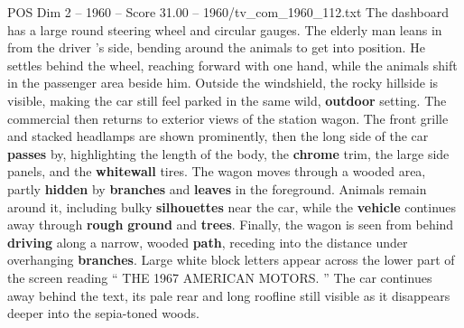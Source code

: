 \begin{textsample}{POS Dim 2 – 1960 – Score 31.00 – 1960/tv\_com\_1960\_112.txt}
The dashboard has a large round steering wheel and circular gauges.
The elderly man leans in from the driver ’s side, bending around the animals to get into position.
He settles behind the wheel, reaching forward with one hand, while the animals shift in the passenger area beside him.
Outside the windshield, the rocky hillside is visible, making the car still feel parked in the same wild, \textbf{outdoor} setting.
The commercial then returns to exterior views of the station wagon.
The front grille and stacked headlamps are shown prominently, then the long side of the car \textbf{passes} by, highlighting the length of the body, the \textbf{chrome} trim, the large side panels, and the \textbf{whitewall} tires.
The wagon moves through a wooded area, partly \textbf{hidden} by \textbf{branches} and \textbf{leaves} in the foreground.
Animals remain around it, including bulky \textbf{silhouettes} near the car, while the \textbf{vehicle} continues away through \textbf{rough} \textbf{ground} and \textbf{trees}.
Finally, the wagon is seen from behind \textbf{driving} along a narrow, wooded \textbf{path}, receding into the distance under overhanging \textbf{branches}.
Large white block letters appear across the lower part of the screen reading “ THE 1967 AMERICAN MOTORS. ” The car continues away behind the text, its pale rear and long roofline still visible as it disappears deeper into the sepia-toned woods.

\end{textsample}
